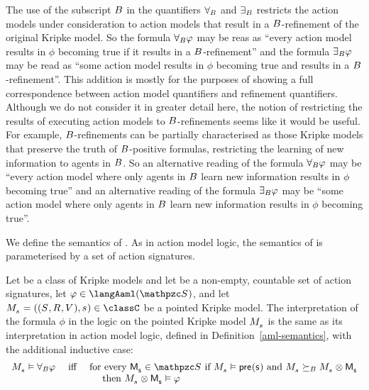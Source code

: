 The use of the subscript $B$ in the quantifiers ${\forall_{B}}$ and ${\exists_{B}}$ restricts the action models under consideration to action models that result in a $B$-refinement of the original Kripke model.
So the formula ${\forall_{B}} \varphi$ may be reas as ``every action model results in $\phi$ becoming true if it results in a $B$-refinement'' and the formula ${\exists_{B}} \varphi$ may be read as ``some action model results in $\phi$ becoming true and results in a $B$-refinement''.
This addition is mostly for the purposes of showing a full correspondence between action model quantifiers and refinement quantifiers.
Although we do not consider it in greater detail here, the notion of restricting the results of executing action models to $B$-refinements seems like it would be useful.
For example, $B$-refinements can be partially characterised as those Kripke models that preserve the truth of $B$-positive formulas, restricting the learning of new information to agents in $B$.
So an alternative reading of the formula ${\forall_{B}} \varphi$ may be ``every action model where only agents in $B$ learn new information results in $\phi$ becoming true'' and an alternative reading of the formula ${\exists_{B}} \varphi$ may be ``some action model where only agents in $B$ learn new information results in $\phi$ becoming true''.

We define the semantics of \logicAaml{}.
As in action model logic, the semantics of \logicAaml{} is parameterised by a set of action signatures.

\begin{definition}
Let \classC{} be a class of Kripke models and let \aSignatureFamily{} be a non-empty, countable set of action signatures, let $\phi \in \langAaml(\aSignatureFamily)$, and let $\kPModelAndTuple{\kStateS} \in \classC$ be a pointed Kripke model.
The interpretation of the formula $\phi$ in the logic \logicAamlC{} on the pointed Kripke model $\kPModel{\kStateS}$ is the same as its interpretation in action model logic, defined in Definition~\ref{aml-semantics}, with the additional inductive case:
$$
\begin{array}{lcl}
    \kPModel{\kStateS} \entails \allactsBs \phi & \text{ iff } & \text{for every } \aPModel{\aStateS} \in \aSignatureFamily \text{ if } \kPModel{\kStateS} \entails \aPrecondition(\aStateS) \text{ and } \kPModel{\kStateS} \simulatesBs \kPModel{\kStateS} \exec \aPModel{\aStateS}\\&&\quad \text{ then } \kPModel{\kStateS} \exec \aPModel{\aStateS} \entails \phi
\end{array}
$$
\end{definition}

